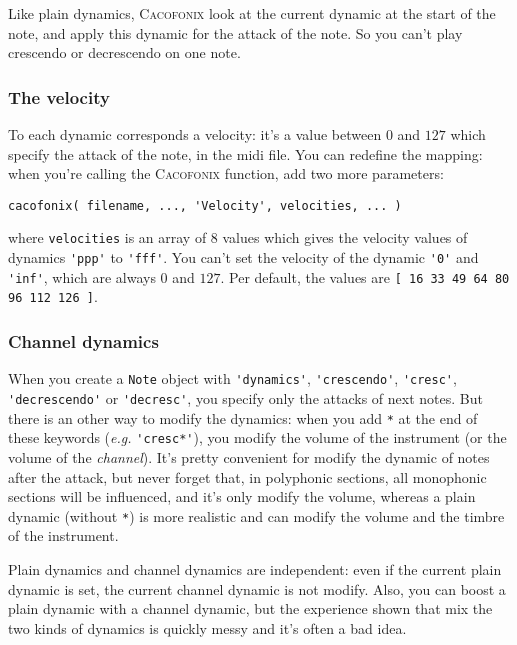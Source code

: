 \documentclass{article}
\newcommand\cacofonix{\textsc{Cacofonix}\xspace}
\begin{document}
Like plain dynamics, \cacofonix look at the current dynamic at the start of the note, and apply this dynamic for the attack of the note. So you can't play crescendo or decrescendo on one note.

\subsubsection{The velocity}
\label{sec:Velocity}

To each dynamic corresponds a velocity: it's a value between $0$ and $127$ which specify the attack of the note, in the midi file. You can redefine the mapping: when you're calling the \cacofonix function, add two more parameters:
\begin{lstlisting}
cacofonix( filename, ..., 'Velocity', velocities, ... )
\end{lstlisting}
where \lstinline!velocities! is an array of $8$ values which gives the velocity values of dynamics \lstinline!'ppp'! to \lstinline!'fff'!. You can't set the velocity of the dynamic \lstinline!'0'! and \lstinline!'inf'!, which are always $0$ and $127$. Per default, the values are \lstinline![ 16 33 49 64 80 96 112 126 ]!.

\subsubsection{Channel dynamics}
\label{sec:ChannelDynamics}

When you create a \lstinline!Note! object with \lstinline!'dynamics'!, \lstinline!'crescendo'!, \lstinline!'cresc'!, \lstinline!'decrescendo'! or \lstinline!'decresc'!, you specify only the attacks of next notes. But there is an other way to modify the dynamics: when you add \lstinline!*! at the end of these keywords (\emph{e.g.} \lstinline!'cresc*'!), you modify the volume of the instrument (or the volume of the \emph{channel}). It's pretty convenient for modify the dynamic of notes after the attack, but never forget that, in polyphonic sections, all monophonic sections will be influenced, and it's only modify the volume, whereas a plain dynamic (without \lstinline!*!) is more realistic and can modify the volume and the timbre of the instrument.

Plain dynamics and channel dynamics are independent: even if the current plain dynamic is set, the current channel dynamic is not modify. Also, you can boost a plain dynamic with a channel dynamic, but the experience shown that mix the two kinds of dynamics is quickly messy and it's often a bad idea.
\end{document}

